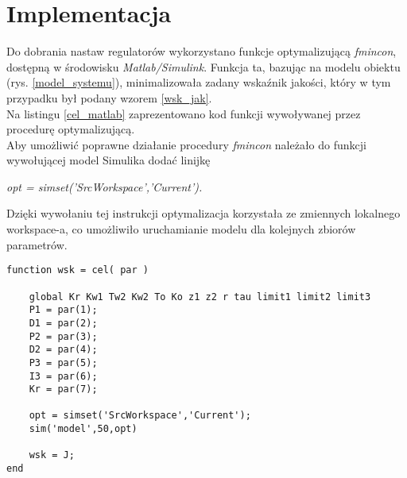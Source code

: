 \chapter{Implementacja}
\label{implementacja}
Do dobrania nastaw regulatorów wykorzystano funkcje optymalizującą \textit{fmincon}, dostępną w środowisku \textit{Matlab/Simulink}. Funkcja ta, bazując na modelu obiektu (rys. \ref{model_systemu}), minimalizowała zadany wska\'znik jakości, który w tym przypadku był podany wzorem \ref{wsk_jak}. \\
Na listingu \ref{cel_matlab} zaprezentowano kod funkcji wywoływanej przez procedurę optymalizującą. \\
Aby umożliwić poprawne działanie procedury \textit{fmincon} należało do funkcji wywołującej model Simulika dodać linijkę
\begin{center}
	\textit{opt = simset('SrcWorkspace','Current').}
\end{center}
 Dzięki wywołaniu tej instrukcji optymalizacja korzystała ze zmiennych lokalnego workspace-a, co umożliwiło uruchamianie modelu dla kolejnych zbiorów parametrów.
\begin{lstlisting}[frame=single, caption=Funkcja wywoływana przez procedurę optymalizującą., label = cel_matlab]
function wsk = cel( par )

	global Kr Kw1 Tw2 Kw2 To Ko z1 z2 r tau limit1 limit2 limit3
	P1 = par(1);
	D1 = par(2);
	P2 = par(3);
	D2 = par(4);
	P3 = par(5);
	I3 = par(6);
	Kr = par(7);
	
	opt = simset('SrcWorkspace','Current');
	sim('model',50,opt)
	
	wsk = J;
end
\end{lstlisting}
\newpage

